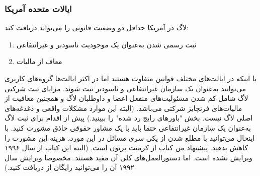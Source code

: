 \subsubsection{ایالات متحده آمریکا}
لاگ در آمریکا حداقل دو وضعیت قانونی را می‌تواند دریافت کند:

\begin{enumerate}
\item
ثبت رسمی شدن به‌عنوان یک موجودیت ناسودبر و غیرانتفاعی
\item
معاف از مالیات
\end{enumerate}

با اینکه در ایالت‌های مختلف قوانین متفاوت هستند اما در اکثر ایالت‌ها
گروه‌های کاربری می‌توانند به‌عنوان یک سازمان غیرانتفاعی و ناسودبر ثبت شوند.
مزایای ثبت شرکتی لاگ شامل کم شدن مسئولیت‌های منفعل اعضا و داوطلبان لاگ
و همچنین معافیت از مالیات‌های فرنچایز شرکتی می‌باشد.
(البته این موارد مشکلات واقعی و دغدغه‌های اصلی لاگ نیست.
بخش "باورهای رایج رد شده" را ببینید.)
پیش از اقدام برای ثبت لاگ به‌عنوان یک سازمان غیرانتفاعی حتما
باید با یک مشاور حقوقی حاذق مشورت کنید. با اینحال می‌توانید با مطلع شدن
از یکی سری مسائل در این مورد، هزینه این مشورت را کاهش بدهید.
پیشنهاد من کتاب
از کرمیت برتون است. (البته این کتاب از سال ۱۹۹۶ ویرایش نشده است.
اما دستورالعمل‌های کلی آن مفید هستند. مخصوصا ویرایش سال ۱۹۹۲ آن
را می‌توانید رایگان از
دریافت کنید.)

